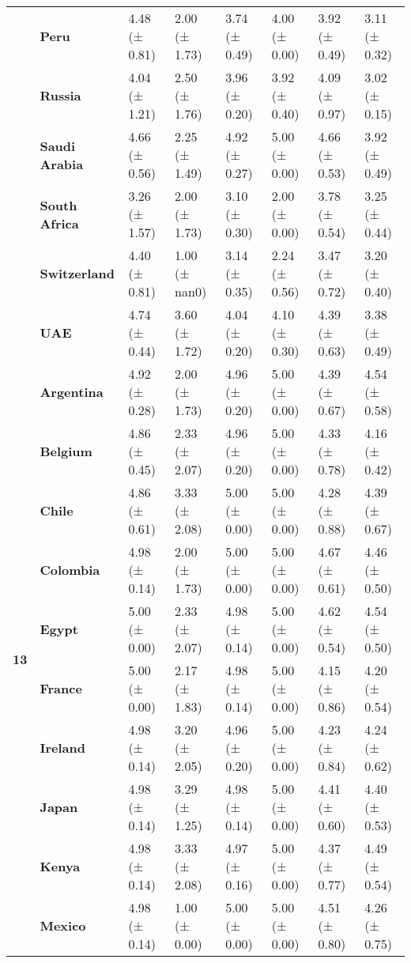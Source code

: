 \begin{tabular}{llllllll}
\textbf{} & \textbf{Peru} & 4.48 (± 0.81) & 2.00 (± 1.73) & 3.74 (± 0.49) & 4.00 (± 0.00) & 3.92 (± 0.49) & 3.11 (± 0.32) \\
\textbf{} & \textbf{Russia} & 4.04 (± 1.21) & 2.50 (± 1.76) & 3.96 (± 0.20) & 3.92 (± 0.40) & 4.09 (± 0.97) & 3.02 (± 0.15) \\
\textbf{} & \textbf{Saudi Arabia} & 4.66 (± 0.56) & 2.25 (± 1.49) & 4.92 (± 0.27) & 5.00 (± 0.00) & 4.66 (± 0.53) & 3.92 (± 0.49) \\
\textbf{} & \textbf{South Africa} & 3.26 (± 1.57) & 2.00 (± 1.73) & 3.10 (± 0.30) & 2.00 (± 0.00) & 3.78 (± 0.54) & 3.25 (± 0.44) \\
\textbf{} & \textbf{Switzerland} & 4.40 (± 0.81) & 1.00 (± nan0) & 3.14 (± 0.35) & 2.24 (± 0.56) & 3.47 (± 0.72) & 3.20 (± 0.40) \\
\textbf{} & \textbf{UAE} & 4.74 (± 0.44) & 3.60 (± 1.72) & 4.04 (± 0.20) & 4.10 (± 0.30) & 4.39 (± 0.63) & 3.38 (± 0.49) \\
\cline{1-8}
\multirow[t]{19}{*}{\textbf{13}} & \textbf{Argentina} & 4.92 (± 0.28) & 2.00 (± 1.73) & 4.96 (± 0.20) & 5.00 (± 0.00) & 4.39 (± 0.67) & 4.54 (± 0.58) \\
\textbf{} & \textbf{Belgium} & 4.86 (± 0.45) & 2.33 (± 2.07) & 4.96 (± 0.20) & 5.00 (± 0.00) & 4.33 (± 0.78) & 4.16 (± 0.42) \\
\textbf{} & \textbf{Chile} & 4.86 (± 0.61) & 3.33 (± 2.08) & 5.00 (± 0.00) & 5.00 (± 0.00) & 4.28 (± 0.88) & 4.39 (± 0.67) \\
\textbf{} & \textbf{Colombia} & 4.98 (± 0.14) & 2.00 (± 1.73) & 5.00 (± 0.00) & 5.00 (± 0.00) & 4.67 (± 0.61) & 4.46 (± 0.50) \\
\textbf{} & \textbf{Egypt} & 5.00 (± 0.00) & 2.33 (± 2.07) & 4.98 (± 0.14) & 5.00 (± 0.00) & 4.62 (± 0.54) & 4.54 (± 0.50) \\
\textbf{} & \textbf{France} & 5.00 (± 0.00) & 2.17 (± 1.83) & 4.98 (± 0.14) & 5.00 (± 0.00) & 4.15 (± 0.86) & 4.20 (± 0.54) \\
\textbf{} & \textbf{Ireland} & 4.98 (± 0.14) & 3.20 (± 2.05) & 4.96 (± 0.20) & 5.00 (± 0.00) & 4.23 (± 0.84) & 4.24 (± 0.62) \\
\textbf{} & \textbf{Japan} & 4.98 (± 0.14) & 3.29 (± 1.25) & 4.98 (± 0.14) & 5.00 (± 0.00) & 4.41 (± 0.60) & 4.40 (± 0.53) \\
\textbf{} & \textbf{Kenya} & 4.98 (± 0.14) & 3.33 (± 2.08) & 4.97 (± 0.16) & 5.00 (± 0.00) & 4.37 (± 0.77) & 4.49 (± 0.54) \\
\textbf{} & \textbf{Mexico} & 4.98 (± 0.14) & 1.00 (± 0.00) & 5.00 (± 0.00) & 5.00 (± 0.00) & 4.51 (± 0.80) & 4.26 (± 0.75) \\

\end{tabular}
